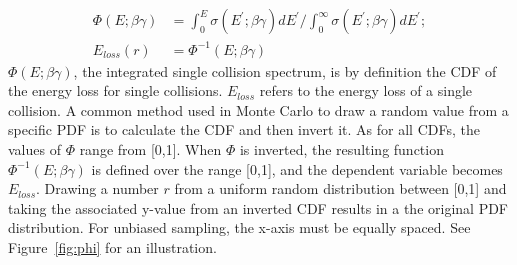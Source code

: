 \begin{equation}
\begin{split}
\Phi(E; \beta \gamma) &= \int_{0}^{E} \sigma(E^{\prime}; \beta \gamma) dE^{\prime} \big / \int_{0}^{\infty} \sigma(E^{\prime}; \beta \gamma) dE^{\prime} ;\\
E_{loss}(r)  &= \Phi^{-1}(E; \beta \gamma) 
\end{split}
\end{equation}
$\Phi(E; \beta \gamma)$, the integrated single collision spectrum, is by definition the \ac{CDF} of the energy loss for single collisions. $E_{loss}$ refers to the energy loss of a single collision. A common method used in Monte Carlo to draw a random value from a specific \ac{PDF} is to calculate the \ac{CDF} and then invert it. As for all \ac{CDF}s, the values of $\Phi$ range from [0,1]. When $\Phi$ is inverted, the resulting function $\Phi^{-1}(E; \beta \gamma)$ is defined over the range [0,1], and the dependent variable becomes $E_{loss}$. Drawing a number $r$ from a uniform random distribution between [0,1] and taking the associated y-value from an inverted \ac{CDF} results in a the original \ac{PDF} distribution. For unbiased sampling, the x-axis must be equally spaced. See Figure~\ref{fig:phi} for an illustration.

